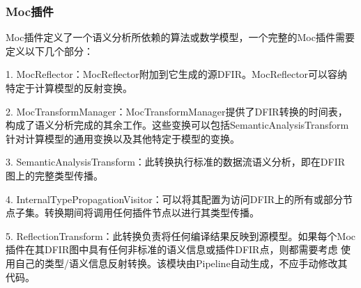 \documentclass[UTF8]{ctexart}
\begin{document}
\subsubsection{Moc插件}
Moc插件定义了一个语义分析所依赖的算法或数学模型，一个完整的Moc插件需要定义以下几个部分：
\par
1. MocReflector：MocReflector附加到它生成的源DFIR。MocReflector可以容纳特定于计算模型的反射变换。
\par
2. MocTransformManager：MocTransformManager提供了DFIR转换的时间表，构成了语义分析完成的其余工作。这些变换可以包括SemanticAnalysisTransform
针对计算模型的通用变换以及其他特定于模型的变换。
\par
3. SemanticAnalysisTransform：此转换执行标准的数据流语义分析，即在DFIR 图上的完整类型传播。
\par
4. InternalTypePropagationVisitor：可以将其配置为访问DFIR上的所有或部分节点子集。转换期间将调用任何插件节点以进行其类型传播。
\par
5. ReflectionTransform：此转换负责将任何编译结果反映到源模型。如果每个Moc插件在其DFIR图中具有任何非标准的语义信息或插件DFIR点，则都需要考虑
使用自己的类型/语义信息反射转换。该模块由Pipeline自动生成，不应手动修改其代码。
\par
%
\end{document}
